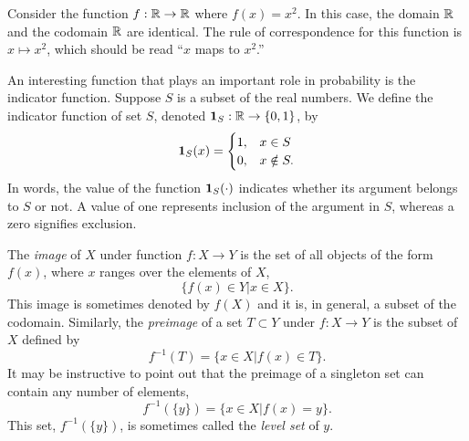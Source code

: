\begin{example}
Consider the function $f: \mathbb{R} \rightarrow \mathbb{R}$ where $f(x) = x^2$.
In this case, the domain $\mathbb{R}$ and the codomain $\mathbb{R}$ are identical.
The rule of correspondence for this function is $x \mapsto x^2$, which should be read ``$x$ maps to $x^2$.''
\end{example}

\begin{example}
An interesting function that plays an important role in probability is the indicator function.
Suppose $S$ is a subset of the real numbers.
We define the indicator function of set $S$, denoted $\mathbf{1}_S: \mathbb{R} \rightarrow \{ 0, 1 \}$, by
\begin{equation*}
\mathbf{1}_S (x) = \begin{cases} 1, & x \in S\\
0, & x \notin S . \end{cases}
\end{equation*}
In words, the value of the function $\mathbf{1}_S (\cdot)$ indicates whether its argument belongs to $S$ or not.
A value of one represents inclusion of the argument in $S$, whereas a zero signifies exclusion.
\end{example}

The \emph{image} of $X$ under function $f: X \rightarrow Y$ is the set of all objects of the form $f(x)$, where $x$ ranges over the elements of $X$,
\begin{equation*}
\{ f(x) \in Y | x \in X \} .
\end{equation*}
This image is sometimes denoted by $f(X)$ and it is, in general, a subset of the codomain.
Similarly, the \emph{preimage} of a set $T \subset Y$ under $f: X \rightarrow Y$ is the subset of $X$ defined by
\begin{equation*}
f^{-1} (T) = \{ x \in X | f(x) \in T \} .
\end{equation*}
It may be instructive to point out that the preimage of a singleton set can contain any number of elements,
\begin{equation*}
f^{-1} (\{ y \}) = \{ x \in X | f(x) = y \} .
\end{equation*}
This set, $f^{-1} (\{ y \})$, is sometimes called the \emph{level set} of $y$.


